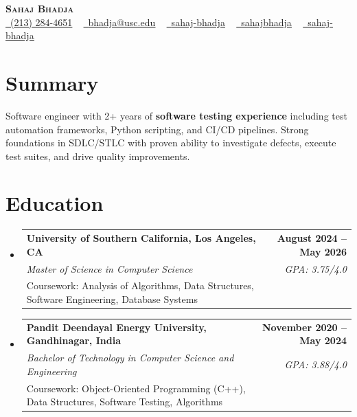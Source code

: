 \documentclass[letterpaper,10pt]{article}
\makeatletter
\newcommand{\resumeEduSubheading}[5]{\vspace{-1pt}\item\begin{tabular*}{1.0\textwidth}[t]{l@{\extracolsep{\fill}}r}\textbf{#1} & \textbf{\small #2} \\\textit{\small #3} & \textit{\small #4} \\\small #5 & \\\end{tabular*}\vspace{-4pt}}
\newcommand{\resumeSubHeadingListStart}{\begin{itemize}[leftmargin=0.0in, label={}]}
\newcommand{\resumeSubHeadingListEnd}{\end{itemize}}
\makeatother
\begin{document}
\begin{center}
{\Huge \scshape \textbf{Sahaj Bhadja}} \\ \vspace{1pt}
\small \href{tel:(213) 284-4651}{\faPhone\ \underline{(213) 284-4651}} ~ \href{mailto:bhadja@usc.edu}{\raisebox{-0.2\height}\faEnvelope\ \underline{bhadja@usc.edu}} ~
\href{https://www.linkedin.com/in/sahaj-bhadja/}{\raisebox{-0.2\height}\faLinkedin\ \underline{sahaj-bhadja}} ~ \href{https://github.com/SAHAJ-BHADJA}{\raisebox{-0.2\height}\faGithub\ \underline{sahajbhadja}} ~
\href{https://sahaj-bhadja.vercel.app/}{\raisebox{-0.2\height}\faGlobe\ \underline{sahaj-bhadja}}
\end{center}
\vspace{-18pt}
\section{Summary}
\begin{itemize}[leftmargin=0.15in, label={}]
\small{\item{Software engineer with 2+ years of \textbf{software testing experience} including test automation frameworks, Python scripting, and CI/CD pipelines. Strong foundations in SDLC/STLC with proven ability to investigate defects, execute test suites, and drive quality improvements.}}
\end{itemize}
\vspace{-16pt}
\section{Education}
\resumeSubHeadingListStart
\resumeEduSubheading{University of Southern California, Los Angeles, CA}{August 2024 -- May 2026}{Master of Science in Computer Science}{GPA: 3.75/4.0}{Coursework: Analysis of Algorithms, Data Structures, Software Engineering, Database Systems}
\vspace{-9pt}
\resumeEduSubheading{Pandit Deendayal Energy University, Gandhinagar, India}{November 2020 -- May 2024}{Bachelor of Technology in Computer Science and Engineering}{GPA: 3.88/4.0}{Coursework: Object-Oriented Programming (C++), Data Structures, Software Testing, Algorithms}
\resumeSubHeadingListEnd
\vspace{-14pt}
\end{document}
